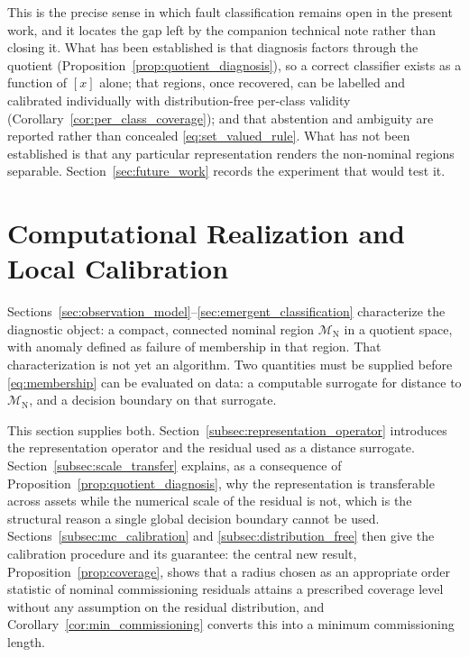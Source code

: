 \documentclass[a4paper]{cas-sc}
\newcommand{\Mnominal}{\ensuremath{\mathcal{M}_{\mathrm{N}}}}
\begin{document}
This is the precise sense in which fault classification remains open in the
present work, and it locates the gap left by the companion technical note
\citep{disanti2026quotient} rather than closing it. What has been established
is that diagnosis factors through the quotient
(Proposition~\ref{prop:quotient_diagnosis}), so a correct classifier exists as
a function of \([x]\) alone; that regions, once recovered, can be labelled and
calibrated individually with distribution-free per-class validity
(Corollary~\ref{cor:per_class_coverage}); and that abstention and ambiguity
are reported rather than concealed \eqref{eq:set_valued_rule}. What has not
been established is that any particular representation renders the non-nominal
regions separable. Section~\ref{sec:future_work} records the experiment that
would test it.

\section{Computational Realization and Local Calibration}
\label{sec:computational_realization}

Sections~\ref{sec:observation_model}--\ref{sec:emergent_classification}
characterize the diagnostic object: a compact, connected nominal region
\(\Mnominal\) in a quotient space, with anomaly defined as failure of
membership in that region. That characterization is not yet an algorithm.
Two quantities must be supplied before
\eqref{eq:membership} can be evaluated on data: a computable surrogate for
distance to \(\Mnominal\), and a decision boundary on that surrogate.

This section supplies both. Section~\ref{subsec:representation_operator}
introduces the representation operator and the residual used as a distance
surrogate. Section~\ref{subsec:scale_transfer} explains, as a consequence
of Proposition~\ref{prop:quotient_diagnosis}, why the representation is
transferable across assets while the numerical scale of the residual is
not, which is the structural reason a single global decision boundary
cannot be used. Sections~\ref{subsec:mc_calibration} and
\ref{subsec:distribution_free} then give the calibration procedure and its
guarantee: the central new result,
Proposition~\ref{prop:coverage}, shows that a radius chosen as an
appropriate order statistic of nominal commissioning residuals attains a
prescribed coverage level without any assumption on the residual
distribution, and Corollary~\ref{cor:min_commissioning} converts this into
a minimum commissioning length.
\end{document}
